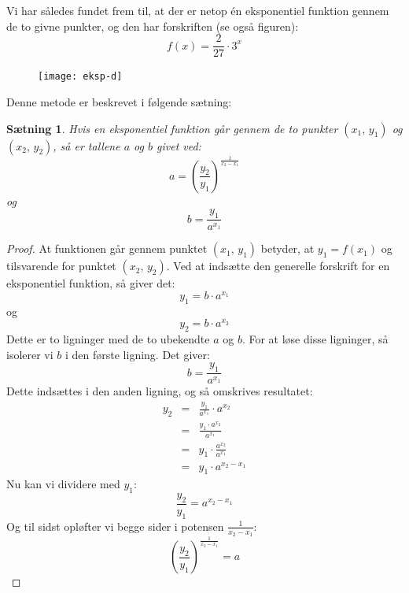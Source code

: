 \documentclass[12pt,oneside,a4paper]{article}
\newcommand{\bas}{\begin{eqnarray*}}
\newcommand{\eas}{\end{eqnarray*}}
\theoremstyle{plain}
\newtheorem*{thm}{Sætning}
\begin{document}
Vi har således fundet frem til, at der er netop én eksponentiel funktion gennem de to givne punkter, og 
den har forskriften (se også figuren):
$$
f(x) = \frac{2}{27} \cdot 3^x
$$

\begin{figure}[ht]
    \centering
    \texttt{[image: eksp-d]}
    \label{eksp-d}
\end{figure}

Denne metode er beskrevet i følgende sætning:

\begin{thm}
    Hvis en eksponentiel funktion går gennem de to punkter $(x_1, \,y_1)$ og $(x_2, \,y_2)$,
    så er tallene $a$ og $b$ givet ved:
    $$
    a = \left(\frac{y_2}{y_1}\right)^{\frac{1}{x_2-x_1}}
    $$
    og
    $$
    b = \frac{y_1}{a^{x_1}}
    $$
\end{thm}
\begin{proof}
    At funktionen går gennem punktet $(x_1, \,y_1)$ betyder, at $y_1 = f(x_1)$ og tilsvarende for punktet
    $(x_2,\,y_2)$. Ved at indsætte den generelle forskrift for en eksponentiel funktion, så giver det:
    $$
    y_1 = b\cdot a^{x_1}
    $$
    og 
    $$
    y_2 = b \cdot a^{x_2}
    $$
    Dette er to ligninger med de to ubekendte $a$ og $b$. For at løse disse ligninger, så 
    isolerer vi $b$ i den første ligning. Det giver:
    $$
    b = \frac{y_1}{a^{x_1}}
    $$
    Dette indsættes i den anden ligning, og så omskrives resultatet:
    \bas
    y_2 &=& \frac{y_1}{a^{x_1}} \cdot a^{x_2} \\
    &=& \frac{y_1 \cdot a^{x_2}}{a^{x_1}} \\
    &=& y_1 \cdot \frac{a^{x_2}}{a^{x_1}} \\
    &=& y_1 \cdot a^{x_2-x_1}
    \eas
    Nu kan vi dividere med $y_1$:
    $$
    \frac{y_2}{y_1} = a^{x_2-x_1}
    $$
    Og til sidst opløfter vi begge sider i potensen $\frac{1}{x_2-x_1}$:
    $$
    \left(\frac{y_2}{y_1}\right)^{\frac{1}{x_2-x_1}} = a
    $$
\end{proof}
\end{document}
